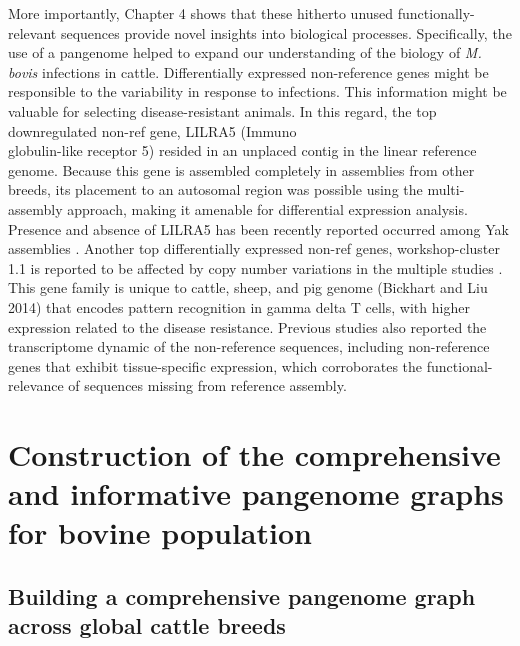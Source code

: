 \documentclass[../main.tex]{subfiles}
\begin{document}
More importantly, Chapter 4 shows that these hitherto unused functionally-relevant sequences provide novel insights into biological processes. Specifically, the use of a pangenome helped to expand our understanding of the biology of \emph{M. bovis} infections in cattle. Differentially expressed non-reference genes might be responsible to the variability in response to infections. This information might be valuable for selecting disease-resistant animals. In this regard, the top downregulated non-ref gene, LILRA5 (Immuno\\globulin-like receptor 5) resided in an unplaced contig in the linear reference genome. Because this gene is assembled completely in assemblies from other breeds, its placement to an  autosomal region was possible using the multi-assembly approach, making it amenable  for differential expression analysis. Presence and absence of LILRA5 has been recently reported occurred among Yak assemblies \citep{ji2021chromosome}. Another top differentially expressed non-ref genes, workshop-cluster 1.1 is reported to be affected by copy number variations in the multiple studies \citep{liu2010analysis,chen2012gene,bickhart2012copy,Low2020}. This gene family is unique to cattle, sheep, and pig genome (Bickhart and Liu 2014) that encodes pattern recognition in gamma delta T cells, with higher expression related to the disease resistance. Previous studies also reported the transcriptome dynamic of the non-reference sequences, including non-reference genes that exhibit tissue-specific expression, which corroborates the functional-relevance of sequences missing from reference assembly. 

\section{Construction of the comprehensive and informative pangenome graphs for bovine population}

\subsection*{Building a comprehensive pangenome graph across global cattle breeds}
\end{document}
